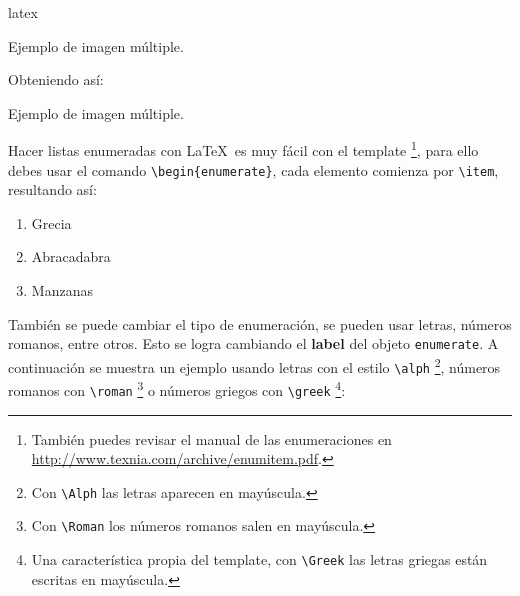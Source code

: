 \begin{sourcecode}{latex}{}
\begin{images}[\label{imagenmultiple}]{Ejemplo de imagen múltiple.}
	\imagesnewline
\end{images}
\end{sourcecode}

	Obteniendo así:

	\begin{images}{Ejemplo de imagen múltiple.}
		\imagesnewline
	\end{images}




		Hacer listas enumeradas con \LaTeX\ es muy fácil con el template \footnote{También puedes revisar el manual de las enumeraciones en \url{http://www.texnia.com/archive/enumitem.pdf}.}, para ello debes usar el comando \texttt{\textbackslash begin\{enumerate\}}, cada elemento comienza por \texttt{\textbackslash item}, resultando así:

		\begin{enumerate}
			\item Grecia
			\item Abracadabra
			\item Manzanas
		\end{enumerate}

		También se puede cambiar el tipo de enumeración, se pueden usar letras, números romanos, entre otros. Esto se logra cambiando el \textbf{label} del objeto \texttt{enumerate}. A continuación se muestra un ejemplo usando letras con el estilo \texttt{\textbackslash alph} \footnote{Con \texttt{\textbackslash Alph} las letras aparecen en mayúscula.}, números romanos con \texttt{\textbackslash roman} \footnote{Con \texttt{\textbackslash Roman} los números romanos salen en mayúscula.} o números griegos con \texttt{\textbackslash greek} \footnote{Una característica propia del template, con \texttt{\textbackslash Greek} las letras griegas están escritas en mayúscula.}:

